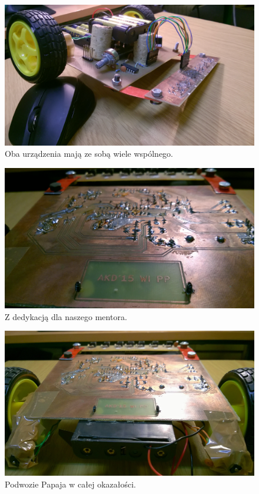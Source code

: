 \documentclass{article}
\begin{document}
\begin{figure}[!htbp]
\centering
\includegraphics[scale=0.12]{./focie/oparcie_2.jpg}
\caption{Oba urządzenia mają ze sobą wiele wspólnego.}
\end{figure}

\begin{figure}[!htbp]
\centering
\includegraphics[scale=0.12]{./focie/dedykacja.jpg}
\caption{Z dedykacją dla naszego mentora.}
\end{figure}

\begin{figure}[!htbp]
\centering
\includegraphics[scale=0.12]{./focie/spod_papaja.jpg}
\caption{Podwozie Papaja w całej okazałości.}
\end{figure}
\end{document}
